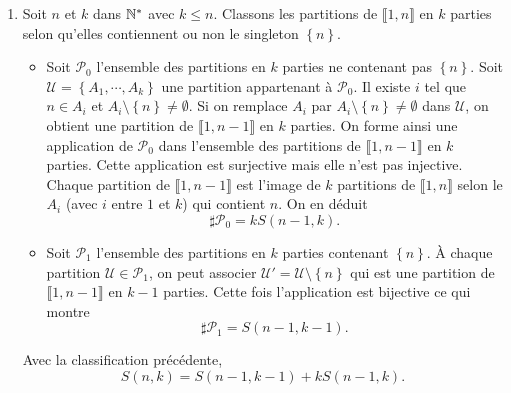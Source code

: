 \begin{enumerate}
 \item Soit $n$ et $k$ dans $\mathbb{N}^*$ avec $k \leq n$. Classons les partitions de $\llbracket 1,n \rrbracket$ en $k$ parties selon qu'elles contiennent ou non le singleton $\left\lbrace n \right\rbrace $.
 \begin{itemize}
  \item Soit $\mathcal{P}_0$ l'ensemble des partitions en $k$ parties ne contenant pas $\left\lbrace n \right\rbrace $.\newline
  Soit $\mathcal{U} = \left\lbrace A_1, \cdots ,A_k\right\rbrace $ une partition appartenant à $\mathcal{P}_0$. Il existe $i$ tel que $n\in A_i$ et $A_i \setminus \left\lbrace  n \right\rbrace \neq \emptyset$. Si on remplace $A_i$ par $A_i \setminus \left\lbrace  n \right\rbrace \neq \emptyset$ dans $\mathcal{U}$, on obtient une partition de $\llbracket 1, n-1 \rrbracket$ en $k$ parties. On forme ainsi une application de $\mathcal{P}_0$ dans l'ensemble des partitions de $\llbracket 1, n-1 \rrbracket$ en $k$ parties. Cette application est surjective mais elle n'est pas injective. Chaque partition de $\llbracket 1, n-1 \rrbracket$ est l'image de $k$ partitions de $\llbracket 1,n \rrbracket$ selon le $A_i$ (avec $i$ entre $1$ et $k$) qui contient $n$. On en déduit
  \[
   \sharp \mathcal{P}_0 = k S(n-1,k).
  \]
  \item Soit $\mathcal{P}_1$ l'ensemble des partitions en $k$ parties contenant $\left\lbrace n \right\rbrace $.\newline
  \`A chaque partition $\mathcal{U}\in \mathcal{P}_1$, on peut associer $\mathcal{U}' = \mathcal{U} \setminus \left\lbrace n\right\rbrace $ qui est une partition de $\llbracket 1, n-1\rrbracket$ en $k-1$ parties. Cette fois l'application est bijective ce qui montre
  \[
   \sharp \mathcal{P}_1 = S(n-1,k-1).
  \]
 \end{itemize}
Avec la classification précédente,
\[
 S(n,k) = S(n-1,k-1) + k S(n-1,k).
\]

\end{enumerate}

